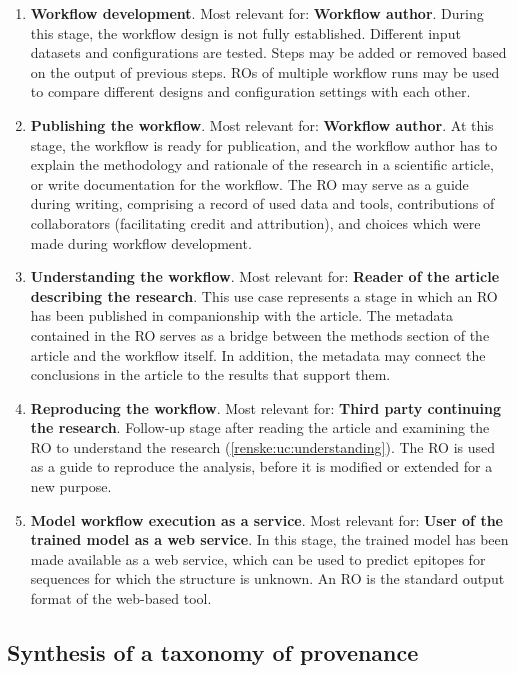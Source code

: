 \begin{enumerate}[label=\textbf{U\arabic*}]
    \item \textbf{Workflow development}. Most relevant for: \textbf{Workflow author}. During this stage, the workflow design is not fully established. Different input datasets and configurations are tested. Steps may be added or removed based on the output of previous steps. ROs of multiple workflow runs may be used to compare different designs and configuration settings with each other. \label{renske:uc:wf_dev}
    \item \textbf{Publishing the workflow}. Most relevant for: \textbf{Workflow author}. At this stage, the workflow is ready for publication, and the workflow author has to explain the methodology and rationale of the research in a scientific article, or write documentation for the workflow. The RO may serve as a guide during writing, comprising a record of used data and tools, contributions of collaborators (facilitating credit and attribution), and choices which were made during workflow development. \label{renske:uc:writing}
    \item \textbf{Understanding the workflow}. Most relevant for: \textbf{Reader of the article describing the research}. This use case represents a stage in which an RO has been published in companionship with the article. The metadata contained in the RO serves as a bridge between the methods section of the article and the workflow itself. In addition, the metadata may connect the conclusions in the article to the results that support them. \label{renske:uc:understanding}
    \item \textbf{Reproducing the workflow}. Most relevant for: \textbf{Third party continuing the research}. Follow-up stage after reading the article and examining the RO to understand the research (\ref{renske:uc:understanding}). The RO is used as a guide to reproduce the analysis, before it is modified or extended for a new purpose. \label{renske:uc:reproducing}
    \item \textbf{Model workflow execution as a service}. Most relevant for: \textbf{User of the trained model as a web service}. In this stage, the trained model has been made available as a web service, which can be used to predict epitopes for sequences for which the structure is unknown. An RO is the standard output format of the web-based tool. \label{renske:uc:service}
\end{enumerate}


\subsection{Synthesis of a taxonomy of provenance}

